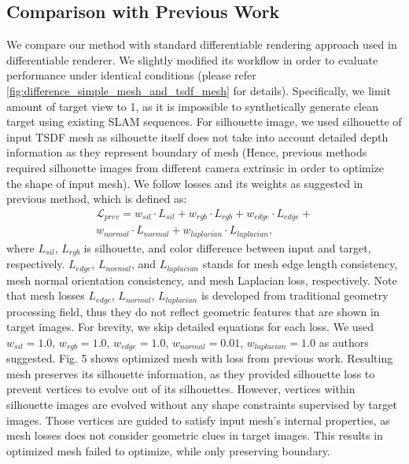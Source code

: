\subsection{Comparison with Previous Work}
We compare our method with standard differentiable rendering approach used in differentiable renderer\cite{liu2019soft}. 
We slightly modified its workflow in order to evaluate performance under identical conditions (please refer \ref{fig:difference_simple_mesh_and_tsdf_mesh} for details). 
Specifically, we limit amount of target view to 1, as it is impossible to synthetically generate clean target using existing SLAM sequences. 
For silhouette image, we used silhouette of input TSDF mesh as silhouette itself does not take into account detailed depth information as they represent boundary of mesh (Hence, previous methods required silhouette images from different camera extrinsic in order to optimize the shape of input mesh). 
We follow losses and its weights as suggested in previous method\cite{ravi2020accelerating}, which is defined as: 
\begin{multline*}
    \mathcal{L}_{prev}=w_{sil}\cdot L_{sil}+w_{rgb}\cdot L_{rgb}+w_{edge}\cdot L_{edge}+ \\ 
    w_{normal}\cdot L_{normal}+w_{laplacian}\cdot L_{laplacian}, 
\end{multline*}
where $L_{sil}$, $L_{rgb}$ is silhouette, and color difference between input and target, respectively. 
$L_{edge}$, $L_{normal}$, and $L_{laplacian}$ stands for mesh edge length consistency, mesh normal orientation consistency, and mesh Laplacian loss, respectively. 
Note that mesh losses $L_{edge}$, $L_{normal}$, $L_{laplacian}$ is developed from traditional geometry processing field, thus they do not reflect geometric features that are shown in target images. 
For brevity, we skip detailed equations for each loss. 
We used $w_{sil}=1.0$, $w_{rgb}=1.0$, $w_{edge}=1.0$, $w_{normal}=0.01$, $w_{laplacian}=1.0$ as authors suggested.
Fig. 5 shows optimized mesh with loss from previous work. 
Resulting mesh preserves its silhouette information, as they provided silhouette loss to prevent vertices to evolve out of its silhouettes. 
However, vertices within silhouette images are evolved without any shape constraints supervised by target images. 
Those vertices are guided to satisfy input mesh’s internal properties, as mesh losses does not consider geometric clues in target images. 
This results in optimized mesh failed to optimize, while only preserving boundary.

